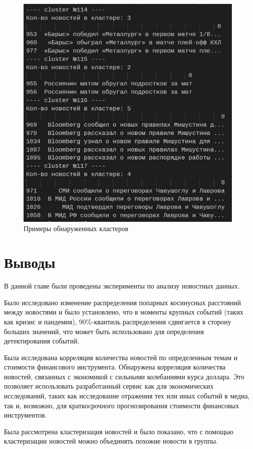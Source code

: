 \begin{figure}[h]
    \centering
    \includegraphics{images/clusters.png}
    \caption{Примеры обнаруженных кластеров}
    \label{img:clusters}
\end{figure}



\section{Выводы}

В данной главе были проведены эксперименты по анализу новостных данных.

Было исследовано изменение распределения попарных косинусных расстояний между новостями и было установлено, что в моменты крупных событий (таких как кризис и пандемия), 90\%-квантиль распределения сдвигается в сторону больших значений, что может быть использовано для определения детектирования событий.

Была исследована корреляция количества новостей по определенным темам и стоимости финансового инструмента. Обнаружена корреляция количества новостей, связанных с экономикой с сильными колебаниями курса доллара. Это позволяет использовать разработанный сервис как для экономических исследований, таких как исследование отражения тех или иных событий в медиа, так и, возможно, для краткосрочного прогнозирования стоимости финансовых инструментов.

Была рассмотрена кластеризация новостей и было показано, что с помощью кластеризации новостей можно объединять похожие новости в группы.
